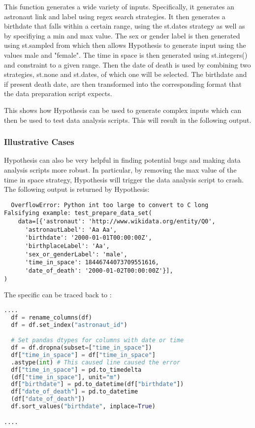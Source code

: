 \documentclass[runningheads]{llncs}
\begin{document}
This function generates a wide variety of inputs. Specifically, it generates an astronaut link and label using regex search strategies.
It then generates a birthdate that falls within a certain range, using the st.dates strategy as well as by specifiying a min and max value.
The sex or gender label is then generated using st.sampled from which then allows Hypothesis to generate input using the values male and "female".
The time in space is then generated using st.integers() and constraint to a given range.
Then the date of death is used by combining two strategies, st.none and st.dates, of which one will be selected.
The birthdate and if present death date, are then transformed into the corresponding format that the data preparation script expects.

This shows how Hypothesis can be used to generate complex inputs which can then be used to test data analysis scripts.
This will result in the following output.

\subsubsection{Illustrative Cases}
Hypothesis can also be very helpful in finding potential bugs and making data analysis scripts more robust. In particular, by removing the max value of the
time in space strategy, Hypothesis will trigger the data analysis script to crash. The following output is returned by Hypothesis:

\begin{verbatim}
  OverflowError: Python int too large to convert to C long
Falsifying example: test_prepare_data_set(
    data=[{'astronaut': 'http://www.wikidata.org/entity/Q0',
      'astronautLabel': 'Aa Aa',
      'birthdate': '2000-01-01T00:00:00Z',
      'birthplaceLabel': 'Aa',
      'sex_or_genderLabel': 'male',
      'time_in_space': 18446744073709551616,
      'date_of_death': '2000-01-02T00:00:00Z'}],
)

\end{verbatim}

The specific can be traced back to :

\begin{lstlisting}[language=Python]
  ....
  df = rename_columns(df)
  df = df.set_index("astronaut_id")

  # Set pandas dtypes for columns with date or time
  df = df.dropna(subset=["time_in_space"])
  df["time_in_space"] = df["time_in_space"]
  .astype(int) # This caused line caused the error
  df["time_in_space"] = pd.to_timedelta
  (df["time_in_space"], unit="m")
  df["birthdate"] = pd.to_datetime(df["birthdate"])
  df["date_of_death"] = pd.to_datetime
  (df["date_of_death"])
  df.sort_values("birthdate", inplace=True)

....
\end{lstlisting}
\end{document}
